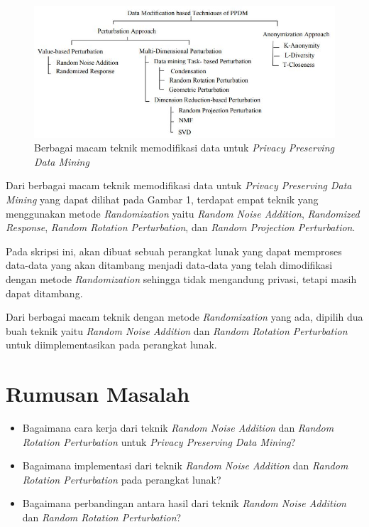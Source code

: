 \documentclass[a4paper,twoside]{article}
\begin{document}
\begin{figure}
	\centering
	\includegraphics[scale=0.785]{ppdm}
	\caption{Berbagai macam teknik memodifikasi data untuk \textit{Privacy Preserving Data Mining}}
	\label{fig:ppdm}
\end{figure}

Dari berbagai macam teknik memodifikasi data untuk \textit{Privacy Preserving Data Mining} yang dapat dilihat pada Gambar 1, terdapat empat teknik yang menggunakan metode \textit{Randomization} yaitu \textit{Random Noise Addition}, \textit{Randomized Response}, \textit{Random Rotation Perturbation}, dan \textit{Random Projection Perturbation}.

Pada skripsi ini, akan dibuat sebuah perangkat lunak yang dapat memproses data-data yang akan ditambang menjadi data-data yang telah dimodifikasi dengan metode \textit{Randomization} sehingga tidak mengandung privasi, tetapi masih dapat ditambang.

Dari berbagai macam teknik dengan metode \textit{Randomization} yang ada, dipilih dua buah teknik yaitu \textit{Random Noise Addition} dan \textit{Random Rotation Perturbation} untuk diimplementasikan pada perangkat lunak.

\section{Rumusan Masalah}
\begin{itemize}
	\item Bagaimana cara kerja dari teknik \textit{Random Noise Addition} dan \textit{Random Rotation Perturbation} untuk \textit{Privacy Preserving Data Mining}?
	\item Bagaimana implementasi dari teknik \textit{Random Noise Addition} dan \textit{Random Rotation Perturbation} pada perangkat lunak?
	\item Bagaimana perbandingan antara hasil dari teknik \textit{Random Noise Addition} dan \textit{Random Rotation Perturbation}?
\end{itemize}
\end{document}
